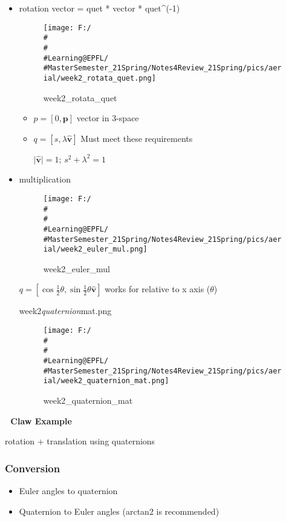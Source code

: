 \documentclass[]{article}
\begin{document}
\begin{itemize}
\item
  rotation vector = quet * vector * quet\^{}(-1)

  \begin{figure}
  \centering
  \texttt{[image: F:/\\\#\\\#\\\#Learning@EPFL/\\\#MasterSemester\_21Spring/Notes4Review\_21Spring/pics/aerial/week2\_rotata\_quet.png]}
  \caption{week2\_rotata\_quet}
  \end{figure}

  \begin{itemize}
  \item
    \( p = [0, \mathbf{p}]\) vector in 3-space
  \item
    \(q = [s, \lambda \hat{\mathbf{v}}]\) Must meet these requirements

    $\vert \hat{\mathbf{v}} \vert = 1$; \(s^2 + \lambda^2 = 1\)
  \end{itemize}
\item
  multiplication

  \begin{figure}
  \centering
  \texttt{[image: F:/\\\#\\\#\\\#Learning@EPFL/\\\#MasterSemester\_21Spring/Notes4Review\_21Spring/pics/aerial/week2\_euler\_mul.png]}
  \caption{week2\_euler\_mul}
  \end{figure}

  \(q=\left[\cos \frac{1}{2} \theta, \sin \frac{1}{2} \theta \hat{\mathbf{v}}\right]\)
  works for relative to x axis (\(\theta\))

  week2\emph{quaternion}mat.png

  \begin{figure}
  \centering
  \texttt{[image: F:/\\\#\\\#\\\#Learning@EPFL/\\\#MasterSemester\_21Spring/Notes4Review\_21Spring/pics/aerial/week2\_quaternion\_mat.png]}
  \caption{week2\_quaternion\_mat}
  \end{figure}
\end{itemize}

\textbf{🚧 Claw Example}

rotation + translation using quaternions

\subsubsection{Conversion}\label{header-n511}

\begin{itemize}
\item
  Euler angles to quaternion
\item
  Quaternion to Euler angles (arctan2 is recommended)
\end{itemize}
\end{document}
